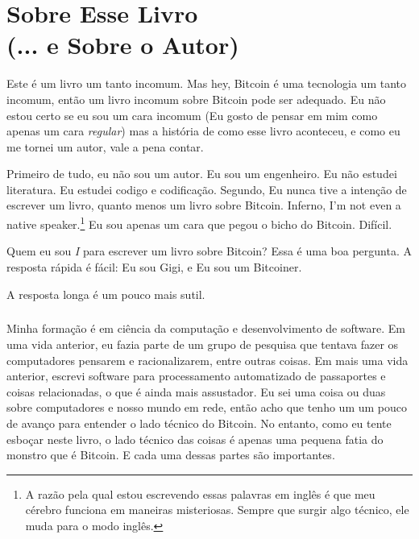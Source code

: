 
\def\bitcoinB{\leavevmode
  {\setbox0=\hbox{\textsf{B}}%
    \dimen0\ht0 \advance\dimen0 0.2ex
    \ooalign{\hfil \box0\hfil\cr
      \hfil\vrule height \dimen0 depth.2ex\hfil\cr
    }%
  }%
}

\chapter*{Sobre Esse Livro \\ (... e Sobre o Autor)}

Este é um livro um tanto incomum. Mas hey, Bitcoin é uma tecnologia um tanto incomum, 
então um livro incomum sobre Bitcoin pode ser adequado. Eu não estou certo se eu sou um cara incomum
(Eu gosto de pensar em mim como apenas um cara \textit{regular}) mas a história
de como esse livro aconteceu, e como eu me tornei um autor, vale a pena contar.

Primeiro de tudo, eu não sou um autor. Eu sou um engenheiro. Eu não estudei 
literatura. Eu estudei codigo e codificação. Segundo, Eu nunca tive a intenção de escrever um livro, 
quanto menos um livro sobre Bitcoin. Inferno, I'm not even a native speaker.\footnote{A razão pela qual estou escrevendo essas palavras em inglês é que meu cérebro funciona em maneiras misteriosas. 
Sempre que surgir algo técnico, ele muda para o modo inglês.} Eu sou apenas um cara que pegou o bicho do Bitcoin. Difícil.

Quem eu sou \textit{I} para escrever um livro sobre Bitcoin? Essa é uma boa pergunta. A resposta rápida é fácil: Eu sou Gigi, e Eu sou um Bitcoiner.

A resposta longa é um pouco mais sutil.

\paragraph{}
Minha formação é em ciência da computação e desenvolvimento de software. Em uma 
vida anterior, eu fazia parte de um grupo de pesquisa que tentava fazer os computadores pensarem
e racionalizarem, entre outras coisas. Em mais uma vida anterior, escrevi software
para processamento automatizado de passaportes e coisas relacionadas, o que é ainda mais assustador. Eu
sei uma coisa ou duas sobre computadores e nosso mundo em rede, então acho que tenho um
um pouco de avanço para entender o lado técnico do Bitcoin. No entanto, como eu
tente esboçar neste livro, o lado técnico das coisas é apenas uma pequena fatia do monstro que é Bitcoin. E cada uma dessas partes são importantes.


